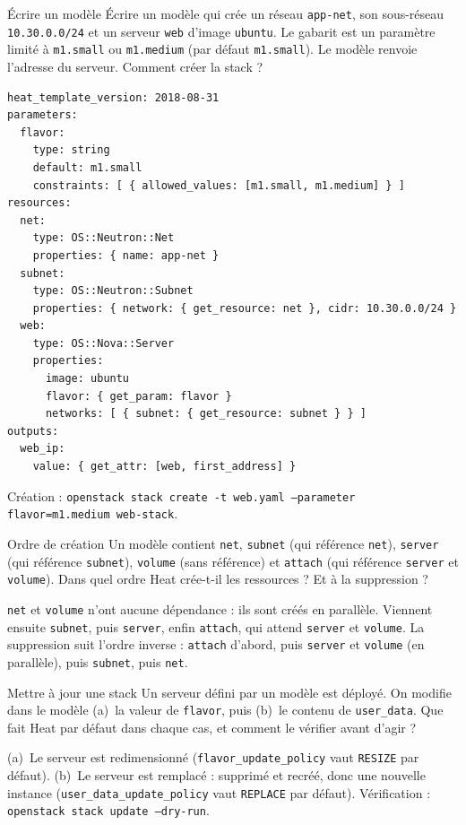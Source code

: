\begin{exercice}{Écrire un modèle}\label{ex:he-modele}
Écrire un modèle qui crée un réseau \texttt{app-net}, son sous-réseau \texttt{10.30.0.0/24} et un serveur \texttt{web}
d'image \texttt{ubuntu}. Le gabarit est un paramètre limité à \texttt{m1.small} ou \texttt{m1.medium} (par défaut
\texttt{m1.small}). Le modèle renvoie l'adresse du serveur. Comment créer la stack ?
\end{exercice}
\begin{correction}
\begin{lstlisting}
heat_template_version: 2018-08-31
parameters:
  flavor:
    type: string
    default: m1.small
    constraints: [ { allowed_values: [m1.small, m1.medium] } ]
resources:
  net:
    type: OS::Neutron::Net
    properties: { name: app-net }
  subnet:
    type: OS::Neutron::Subnet
    properties: { network: { get_resource: net }, cidr: 10.30.0.0/24 }
  web:
    type: OS::Nova::Server
    properties:
      image: ubuntu
      flavor: { get_param: flavor }
      networks: [ { subnet: { get_resource: subnet } } ]
outputs:
  web_ip:
    value: { get_attr: [web, first_address] }
\end{lstlisting}
Création : \texttt{openstack stack create -t web.yaml --parameter flavor=m1.medium web-stack}.
\end{correction}

\begin{exercice}{Ordre de création}\label{ex:he-ordre}
Un modèle contient \texttt{net}, \texttt{subnet} (qui référence \texttt{net}), \texttt{server} (qui référence \texttt{subnet}),
\texttt{volume} (sans référence) et \texttt{attach} (qui référence \texttt{server} et \texttt{volume}). Dans quel ordre Heat
crée-t-il les ressources ? Et à la suppression ?
\end{exercice}
\begin{correction}
\texttt{net} et \texttt{volume} n'ont aucune dépendance : ils sont créés en parallèle. Viennent ensuite \texttt{subnet}, puis
\texttt{server}, enfin \texttt{attach}, qui attend \texttt{server} et \texttt{volume}. La suppression suit l'ordre inverse :
\texttt{attach} d'abord, puis \texttt{server} et \texttt{volume} (en parallèle), puis \texttt{subnet}, puis \texttt{net}.
\end{correction}

\begin{exercice}{Mettre à jour une stack}\label{ex:he-maj}
Un serveur défini par un modèle est déployé. On modifie dans le modèle (a)~la valeur de \texttt{flavor}, puis
(b)~le contenu de \texttt{user\_data}. Que fait Heat par défaut dans chaque cas, et comment le vérifier avant d'agir ?
\end{exercice}
\begin{correction}
(a)~Le serveur est redimensionné (\texttt{flavor\_\allowbreak update\_\allowbreak policy} vaut \texttt{RESIZE} par défaut).
(b)~Le serveur est remplacé : supprimé et recréé, donc une nouvelle instance (\texttt{user\_\allowbreak data\_\allowbreak update\_\allowbreak policy}
vaut \texttt{REPLACE} par défaut). Vérification : \texttt{openstack stack update --dry-run}.
\end{correction}

